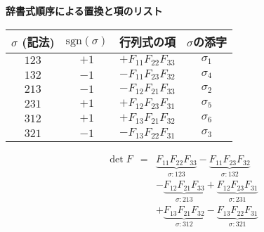 \documentclass{ltjsarticle}
\begin{document}
\begin{center}
\textbf{辞書式順序による置換と項のリスト} \\ %
\vspace{2mm} %
\begin{tabular}{|c|c|c|c|}
\hline
$\sigma$ (記法) & $\text{sgn}(\sigma)$ & 行列式の項 & $\sigma$の添字 \\ %
\hline
$123$ & $+1$ & $+F_{11}F_{22}F_{33}$ & $\sigma_1$ \\
\hline
$132$ & $-1$ & $-F_{11}F_{23}F_{32}$ & $\sigma_4$ \\
\hline
$213$ & $-1$ & $-F_{12}F_{21}F_{33}$ & $\sigma_2$ \\
\hline
$231$ & $+1$ & $+F_{12}F_{23}F_{31}$ & $\sigma_5$ \\
\hline
$312$ & $+1$ & $+F_{13}F_{21}F_{32}$ & $\sigma_6$ \\
\hline
$321$ & $-1$ & $-F_{13}F_{22}F_{31}$ & $\sigma_3$ \\
\hline
\end{tabular}
\end{center}

$$
\begin{array}{rcl}
\det F &=& \underbrace{F_{11}F_{22}F_{33}}_{\sigma: 123} - \underbrace{F_{11}F_{23}F_{32}}_{\sigma: 132} \\
&& - \underbrace{F_{12}F_{21}F_{33}}_{\sigma: 213} + \underbrace{F_{12}F_{23}F_{31}}_{\sigma: 231} \\
&& + \underbrace{F_{13}F_{21}F_{32}}_{\sigma: 312} - \underbrace{F_{13}F_{22}F_{31}}_{\sigma: 321}
\end{array}
$$
\end{document}
